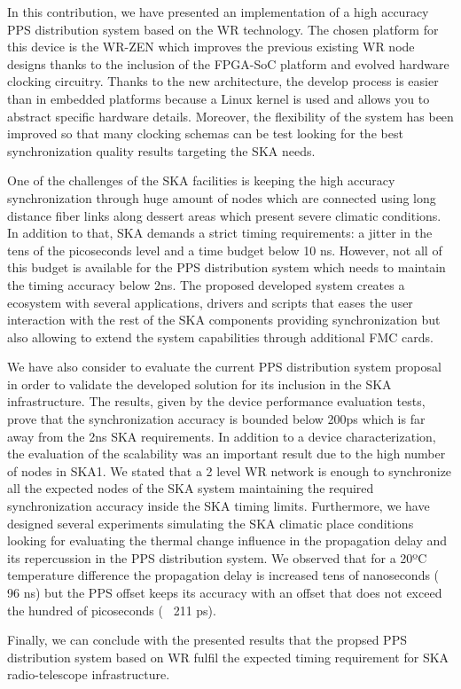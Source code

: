 In this contribution, we have presented an implementation of a high accuracy 
PPS distribution system based on the WR technology. The chosen platform for 
this device is the WR-ZEN which improves the previous existing WR node designs 
thanks to the inclusion of the FPGA-SoC platform and evolved hardware clocking 
circuitry. Thanks to the new architecture, the develop process is easier than 
in embedded platforms because a Linux kernel is used and allows you to abstract 
specific hardware details. Moreover, the flexibility of the system has been 
improved so that many clocking schemas can be test looking for the best 
synchronization quality results targeting the SKA needs.

One of the challenges of the SKA facilities is keeping the high accuracy 
synchronization through huge amount of nodes which are connected using long 
distance fiber links along dessert areas which present severe climatic 
conditions. In addition to that, SKA demands a strict timing requirements: a 
jitter in the tens of the picoseconds level and a time budget below 10 ns. 
However, not all of this budget is available for the PPS distribution system 
which needs to maintain the timing accuracy below 2ns. The proposed developed 
system creates a ecosystem with several applications, drivers and scripts that 
eases the user interaction with the rest of the 
SKA components providing synchronization but also allowing to extend the system 
capabilities through additional FMC cards.

We have also consider to evaluate the current PPS distribution system proposal 
in order to validate the developed solution for its inclusion in the SKA 
infrastructure. The results, given by the device performance evaluation tests, 
prove that the synchronization accuracy is bounded below 200ps which is far 
away from the 2ns SKA requirements. In addition to a device characterization, 
the evaluation of the scalability was an important result due to the high 
number of nodes in SKA1. We stated that a 2 level WR network is enough to 
synchronize all the expected nodes of the SKA system maintaining the required 
synchronization accuracy inside the SKA timing limits. Furthermore, we have 
designed several experiments simulating the SKA climatic place conditions 
looking for evaluating the thermal change influence in the propagation delay 
and its repercussion in the PPS distribution system. We observed that for a 
20ºC temperature difference the propagation delay is increased tens of 
nanoseconds (~ 96 ns) but the PPS offset keeps its accuracy with an offset that 
does not exceed the hundred of picoseconds (~ 211 ps). 

Finally, we can conclude with the presented results that the propsed PPS 
distribution system based on WR fulfil the expected timing requirement for SKA 
radio-telescope infrastructure.